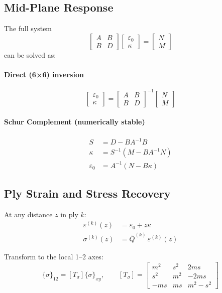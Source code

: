\documentclass[12pt,a4paper]{article}
\begin{document}
\subsection{Mid-Plane Response}
The full system
\[
\begin{bmatrix}A&B\\B&D\end{bmatrix}
\begin{bmatrix}\varepsilon_0\\\kappa\end{bmatrix}
=\begin{bmatrix}N\\M\end{bmatrix}
\]
can be solved as:

\paragraph{Direct (6×6) inversion}
\[
\begin{bmatrix}\varepsilon_0\\\kappa\end{bmatrix}=
\begin{bmatrix}A&B\\B&D\end{bmatrix}^{-1}
\begin{bmatrix}N\\M\end{bmatrix}
\]

\paragraph{Schur Complement (numerically stable)}
\begin{align}
S &= D - B A^{-1} B\\
\kappa &= S^{-1}(M - B A^{-1} N)\\
\varepsilon_0 &= A^{-1}(N - B\kappa)
\end{align}

\subsection{Ply Strain and Stress Recovery}
At any distance $z$ in ply $k$:
\begin{align}
\varepsilon^{(k)}(z) &= \varepsilon_0 + z\kappa\\
\sigma^{(k)}(z) &= \bar Q^{(k)}\,\varepsilon^{(k)}(z)
\end{align}

Transform to the local 1–2 axes:
\[
\{\sigma\}_{12} = [T_\sigma]\{\sigma\}_{xy},\qquad
[T_\sigma]=
\begin{bmatrix}
m^2 & s^2 & 2ms\\
s^2 & m^2 & -2ms\\
-ms & ms & m^2-s^2
\end{bmatrix}
\]
\end{document}
